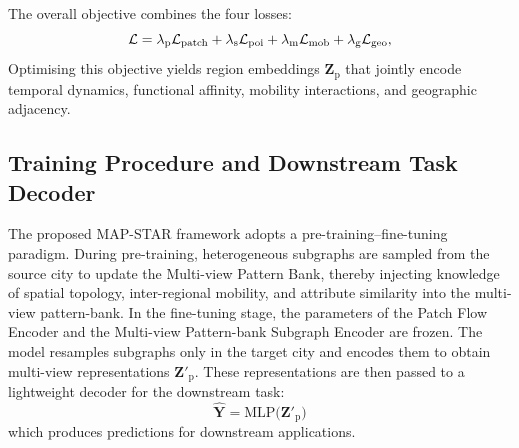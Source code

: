 The overall objective combines the four losses:
\begin{equation}
\mathcal L=\lambda_{\text p}\mathcal L_{\text{patch}}+
\lambda_{\text s}\mathcal L_{\text{poi}}+
\lambda_{\text m}\mathcal L_{\text{mob}}+
\lambda_{\text g}\mathcal L_{\text{geo}},
\end{equation}
Optimising this objective yields region embeddings $\mathbf Z_{\mathrm p}$ that jointly encode temporal dynamics, functional affinity, mobility interactions, and geographic adjacency.

\subsection{Training Procedure and Downstream Task Decoder}
The proposed MAP-STAR framework adopts a pre-training–fine-tuning paradigm. During pre-training, heterogeneous subgraphs are sampled from the source city to update the Multi-view Pattern Bank, thereby injecting knowledge of spatial topology, inter-regional mobility, and attribute similarity into the multi-view pattern-bank. In the fine-tuning stage, the parameters of the Patch Flow Encoder and the Multi-view Pattern-bank Subgraph Encoder are frozen. The model resamples subgraphs only in the target city and encodes them to obtain multi-view representations $\mathbf Z'_{\mathrm p}$. These representations are then passed to a lightweight decoder for the downstream task:
\begin{equation}
\hat{\mathbf Y}= \mathrm{MLP}\bigl(\mathbf Z'_{\mathrm p}\bigr)
\end{equation}
which produces predictions for downstream applications.
